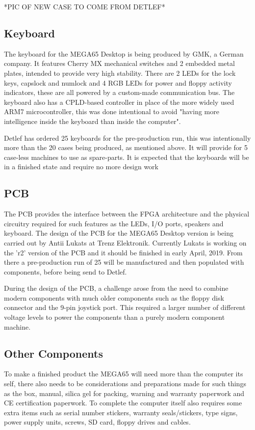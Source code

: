 *PIC OF NEW CASE TO COME FROM DETLEF*

\subsection{Keyboard}
The keyboard for the MEGA65 Desktop is being produced by GMK, a German company. It features Cherry MX mechanical switches and 2 embedded metal plates, intended to provide very high stability. There are 2 LEDs for the lock keys, capslock and numlock and 4 RGB LEDs for power and floppy activity indicators, these are all powered by a custom-made communication bus. The keyboard also has a CPLD-based controller in place of the more widely used ARM7 microcontroller, this was done intentional to avoid "having more intelligence inside the keyboard than inside the computer".

Detlef has ordered 25 keyboards for the pre-production run, this was intentionally more than the 20 cases being produced, as mentioned above. It will provide for 5 case-less machines to use as spare-parts. It is expected that the keyboards will be in a finished state and require no more design work 

\subsection{PCB}
The PCB provides the interface between the FPGA architecture and the physical circuitry required for such features as the LEDs, I/O ports, speakers and keyboard. The design of the PCB for the MEGA65 Desktop version is being carried out by Antii Lukats at Trenz Elektronik. Currently Lukats is working on the 'r2' version of the PCB and it should be finished in early April, 2019. From there a pre-production run of 25 will be manufactured and then populated with components, before being send to Detlef. 

During the design of the PCB, a challenge arose from the need to combine modern components with much older components such as the floppy disk connector and the 9-pin joystick port. This required a larger number of different voltage levels to power the components than a purely modern component machine. 

\subsection{Other Components}
To make a finished product the MEGA65 will need more than the computer its self, there also needs to be considerations and preparations made for such things as the box, manual, silica gel for packing, warning and warranty paperwork and CE certification paperwork. To complete the computer itself also requires some extra items such as serial number stickers, warranty seals/stickers, type signs, power supply units, screws, SD card, floppy drives and cables.